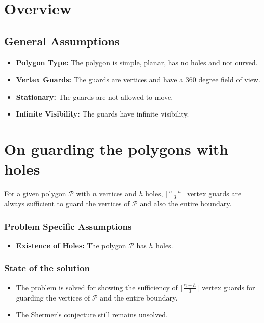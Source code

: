 \documentclass{Assignment}
\begin{document}
\maketitlepage

\section*{Overview}
\printtopicsandauthors
\vspace{-0.8cm}
\subsection*{General Assumptions}
\vspace{-0.3cm}
\begin{itemize}
    \itemsep-0.3em
    \item \textbf{Polygon Type:} The polygon is simple, planar, has no holes and not curved.
    \item \textbf{Vertex Guards:} The guards are vertices and have a 360 degree field of view.
    \item \textbf{Stationary:} The guards are not allowed to move.
    \item \textbf{Infinite Visibility:} The guards have infinite visibility.
\end{itemize}
\vspace{-0.5cm}
\section*{On guarding the polygons with holes\supercite{on_guarding_polygons_with_holes}}
\begin{problem}
    For a given polygon $\mathcal{P}$ with $n$ vertices and $h$ holes, $\lfloor \frac{n+h}3 \rfloor$ vertex guards are always sufficient to guard the vertices of $\mathcal{P}$ and also the entire boundary.
\end{problem}
\vspace{-0.6cm}
\subsubsection*{Problem Specific Assumptions}
\vspace{-0.3cm}
\begin{itemize}
    \itemsep-0.3em
    \item \textbf{Existence of Holes:} The polygon $\mathcal{P}$ has $h$ holes. 
\end{itemize}
\vspace{-0.8cm}
\subsubsection*{State of the solution}
\vspace{-0.3cm}
\begin{itemize}
    \itemsep-0.3em
    \item The problem is solved for showing the sufficiency of $\lfloor \frac{n+h}3 \rfloor$ vertex guards for guarding the vertices of $\mathcal{P}$ and the entire boundary.
    \item The Shermer's conjecture still remains unsolved.
\end{itemize}
\vspace{-0.8cm}
\end{document}
